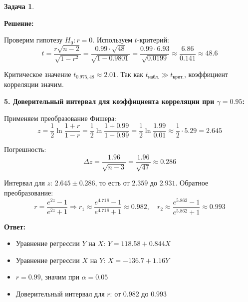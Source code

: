 \documentclass[a4paper,11pt]{article}
\newenvironment{shdd}{\begin{mdframed}[backgroundcolor=shadecolor]}{\end{mdframed}}
\theoremstyle{definition}
\newtheorem{problem}{Задача}\setlength{\parindent}{0pt}
\newenvironment{solution}
{\begin{shdd}
     \textbf{Решение:}\par\setlength{\parindent}{0pt}}
     {
\end{shdd}}
\newenvironment{answer}
{\par\noindent\textbf{Ответ:}}
{\par}
\begin{document}
\begin{problem}
\begin{solution}
            Проверим гипотезу \(H_0: r = 0\). Используем \(t\)-критерий:
            \[
            t = \frac{r \sqrt{n - 2}}{\sqrt{1 - r^2}} = \frac{0.99 \cdot \sqrt{48}}{\sqrt{1 - 0.9801}} = \frac{0.99 \cdot 6.93}{\sqrt{0.0199}} \approx \frac{6.86}{0.141} \approx 48.6
            \]

            Критическое значение \(t_{0.975,48} \approx 2.01\). Так как \(t_\text{набл.} \gg t_\text{крит.}\), коэффициент корреляции значим.

            \textbf{5. Доверительный интервал для коэффициента корреляции при \(\gamma = 0.95\):}

            Применяем преобразование Фишера:
            \[
            z = \frac{1}{2} \ln \frac{1 + r}{1 - r} = \frac{1}{2} \ln \frac{1 + 0.99}{1 - 0.99} = \frac{1}{2} \ln \frac{1.99}{0.01} \approx \frac{1}{2} \cdot 5.29 = 2.645
            \]

            Погрешность:
            \[
            \Delta z = \frac{1.96}{\sqrt{n - 3}} = \frac{1.96}{\sqrt{47}} \approx 0.286
            \]

            Интервал для \(z\): \(2.645 \pm 0.286\), то есть от \(2.359\) до \(2.931\). Обратное преобразование:
            \[
            r = \frac{e^{2z} - 1}{e^{2z} + 1}
            \Rightarrow
            r_1 \approx \frac{e^{4.718} - 1}{e^{4.718} + 1} \approx 0.982, \quad
            r_2 \approx \frac{e^{5.862} - 1}{e^{5.862} + 1} \approx 0.993
            \]

        \end{solution}

        \begin{answer}
            \begin{itemize}
              \item Уравнение регрессии \(Y\) на \(X\): \(Y = 118.58 + 0.844 X\)
              \item Уравнение регрессии \(X\) на \(Y\): \(X = -136.7 + 1.16 Y\)
              \item \(r = 0.99\), значим при \(\alpha = 0.05\)
              \item Доверительный интервал для \(r\): от \(0.982\) до \(0.993\)
            \end{itemize}
        \end{answer}

    \end{problem}
\end{document}
